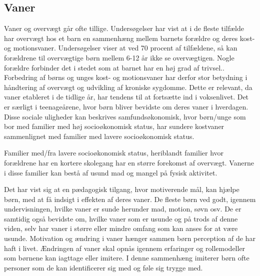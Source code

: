 \subsection{Vaner}

Vaner og overvægt går ofte tillige. Undersøgelser har vist at i de fleste tilfælde har overvægt hos et barn en sammenhæng mellem barnets forældre og deres kost- og motionsvaner. Undersøgelser viser at ved 70 procent af tilfældene, så kan forældrene til overvægtige børn mellem 6-12 år ikke se overvægtigen. Nogle forældre forbinder det i stedet som at barnet har en høj grad af trivsel.\citep{videnskab}. 
Forbedring af børns og unges kost- og motionsvaner har derfor stor betydning i håndtering af overvægt og udvikling af kroniske sygdomme. Dette er relevant, da vaner etableret i de tidlige år, har tendens til at fortsætte ind i voksenlivet.\citep{trends}  Det er særligt i teenageårene, hvor børn bliver bevidste om deres vaner i hverdagen.\citep{dansker} 
Disse sociale uligheder kan beskrives samfundsøkonomisk, hvor børn/unge som bor med familier med høj socioøkonomisk status, har sundere kostvaner sammenlignet med familier med lavere socioøkonomisk status.\citep{trends} 

Familier med/fra lavere socioøkonomisk status, heriblandt familier hvor forældrene har en kortere skolegang har en større forekomst af overvægt. 
Vanerne i disse familier kan bestå af usund mad og mangel på fysisk aktivitet. 

Det har vist sig at en pædagogisk tilgang, hvor motiverende mål, kan hjælpe børn, med at få indsigt i effekten af deres vaner. De fleste børn ved godt, igennem undervisningen, hvilke vaner er sunde herunder mad, motion, søvn osv. De er samtidig også bevidste om, hvilke vaner som er usunde og på trods af denne viden, selv har vaner i større eller mindre omfang som kan anses for at være usunde. 
Motivation og ændring i vaner hænger sammen børn perception af de har haft i livet. Ændringen af vaner skal opnås igennem erfaringer og rollemodeller som børnene kan iagttage eller imitere. I denne sammenhæng imiterer børn ofte personer som de kan identificerer sig med og føle sig trygge med.\citep{opsporing}
